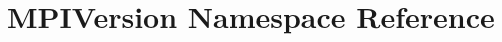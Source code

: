 \hypertarget{namespaceMPIVersion}{\section{M\-P\-I\-Version Namespace Reference}
\label{namespaceMPIVersion}
}
